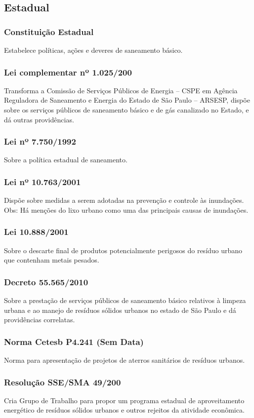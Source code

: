 \begin{subapend}
	\subsection{Estadual}
	\begin{subsubapend}
		\subsubsection{Constituição Estadual}
		Estabelece políticas, ações e deveres de saneamento básico.
		\subsubsection{Lei complementar nº 1.025/200}
		Transforma a Comissão de Serviços Públicos de Energia – CSPE em Agência Reguladora de Saneamento e Energia do Estado de São Paulo – ARSESP, dispõe sobre os serviços públicos de saneamento básico e de gás canalizado no Estado, e dá outras providências.
		\subsubsection{Lei nº 7.750/1992}
		Sobre a política estadual de saneamento.
		\subsubsection{Lei nº 10.763/2001}
		Dispõe sobre medidas a serem adotadas na prevenção e controle às inundações. Obs: Há menções do lixo urbano como uma das principais causas de inundações.
		\subsubsection{Lei 10.888/2001}
		Sobre o descarte final de produtos potencialmente perigosos do resíduo urbano que contenham metais pesados.
		\subsubsection{Decreto 55.565/2010}
		Sobre a prestação de serviços públicos de saneamento básico relativos à limpeza urbana e ao manejo de resíduos sólidos urbanos no estado de São Paulo e dá providências correlatas.
		\subsubsection{Norma Cetesb P4.241 (Sem Data)}
		Norma para apresentação de projetos de aterros sanitários de resíduos urbanos.
		\subsubsection{Resolução SSE/SMA 49/200}
		Cria Grupo de Trabalho para propor um programa estadual de aproveitamento energético de resíduos sólidos urbanos e outros rejeitos da atividade econômica.
	\end{subsubapend}
\end{subapend}

